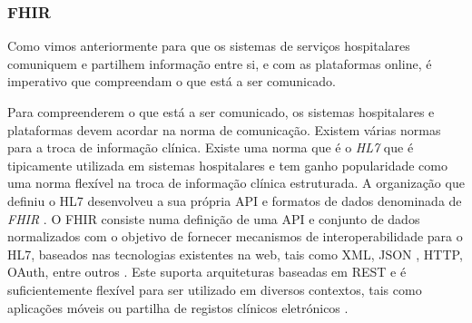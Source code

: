 \subsubsection{FHIR}
Como vimos anteriormente para que os sistemas de serviços hospitalares comuniquem e partilhem  informação entre si, e com as plataformas online, é imperativo que compreendam o que está a ser comunicado.
\par 
Para compreenderem o que está a ser comunicado, os sistemas hospitalares e plataformas devem acordar na norma de comunicação. Existem várias normas para a troca de informação clínica. Existe uma norma que é o \textit{\gls{HL7}} que é tipicamente utilizada em sistemas hospitalares \cite{whyihe} e tem ganho popularidade como uma norma flexível na troca de informação clínica estruturada.
A organização que definiu o \gls{HL7} desenvolveu a sua própria \gls{API} e formatos de dados denominada de \textit{\gls{FHIR}} \cite{hl7fhir}. O \gls{FHIR} consiste numa definição de uma \gls{API} e conjunto de dados normalizados com o objetivo de fornecer mecanismos de interoperabilidade para o \gls{HL7}, baseados nas tecnologias existentes na web, tais como \gls{XML}, \gls{JSON} , \gls{HTTP}, OAuth, entre outros \cite{hl7fhir}. Este suporta arquiteturas baseadas em \gls{REST} e é suficientemente flexível para ser utilizado em diversos contextos, tais como aplicações móveis ou partilha de registos clínicos eletrónicos \cite{hl7fhir}.

